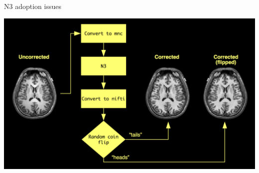 \documentclass[ignorenonframetext,]{beamer}
\begin{document}
\begin{frame}{N3 adoption issues}

\includegraphics{./tools/n4/figures/whyN4.png}

\end{frame}
\end{document}
